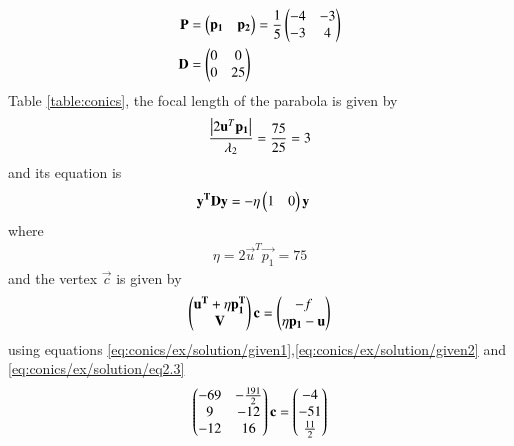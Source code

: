 \begin{enumerate}
\begin{align}
\mathbf{P}&=\begin{pmatrix}\mathbf{p_1}&\mathbf{p_2}\end{pmatrix}=\frac{1}{5}\begin{pmatrix}-4&-3\\ -3 &4\end{pmatrix} \\
\mathbf{D}&=\begin{pmatrix}0&0\\0&25\end{pmatrix}
\end{align}
Table \ref{table:conics}, the focal length of the parabola is given by 
\begin{align}
\frac{\left\vert2\mathbf{u}^T\mathbf{p_1}\right\vert}{\lambda_2}
    = \frac{75}{25}=3
\end{align}
and its equation is
\begin{align}
    \mathbf{y^T}\mathbf{D}\mathbf{y}&=-\eta\begin{pmatrix}1&0\end{pmatrix}\mathbf{y}\label{eq:conics/ex/solution/eq2.4}
\end{align}
where
\begin{align}
    \eta=2\vec{u}^T\vec{p_1}=75
\end{align}
and the vertex $\vec{c}$ is given by 
\begin{align}
    \begin{pmatrix}\mathbf{u^T}+\eta\mathbf{p_1^T} \\ \mathbf{V}\end{pmatrix}\mathbf{c}=
    \begin{pmatrix}-f \\ \eta\mathbf{p_1}-\mathbf{u}\end{pmatrix} 
\end{align}
using equations \eqref{eq:conics/ex/solution/given1},\eqref{eq:conics/ex/solution/given2} and \eqref{eq:conics/ex/solution/eq2.3}
\begin{align}
    \myvec{-69& -\frac{191}{2} \\ 9 & -12 \\  -12 & 16 }\vec{c}=\myvec{-4 \\ -51 \\ \frac{11}{2}} \label{eq:conics/ex/solution/eqcen}

\end{align}
\end{enumerate}
